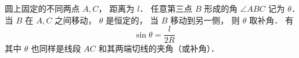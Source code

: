 
\begin{issues}
\issueDraft
\end{issues}

圆上固定的不同两点 $A,C$， 距离为 $l$． 任意第三点 $B$ 形成的角 $\angle ABC$ 记为 $\theta$． 当 $B$ 在 $A,C$ 之间移动， $\theta$ 是恒定的， 当 $B$ 移动到另一侧， 则 $\theta$ 取补角． 有
\begin{equation}\label{SphTri_eq1}
\sin\theta = \frac{l}{2R}
\end{equation}
其中 $\theta$ 也同样是线段 $AC$ 和其两端切线的夹角（或补角）．

